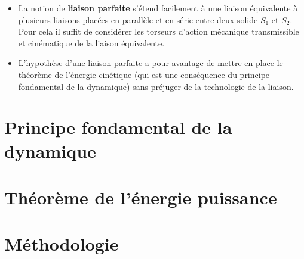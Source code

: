 \begin{rem}%
\begin{itemize}
\item La notion de \textbf{liaison parfaite} s'étend facilement à une liaison équivalente à plusieurs liaisons placées en parallèle et en série entre deux solide $S_1$ et $S_2$. Pour cela il suffit de considérer les torseurs d'action mécanique transmissible et cinématique de la liaison équivalente.
\item L'hypothèse d'une liaison parfaite a pour avantage de mettre en place le théorème de l'énergie cinétique (qui est une conséquence du principe fondamental de la dynamique) sans préjuger de la technologie de la liaison.
\end{itemize}
\end{rem}%


\section{Principe fondamental de la dynamique}

\section{Théorème de l'énergie puissance}

\section{Méthodologie}




%
%




